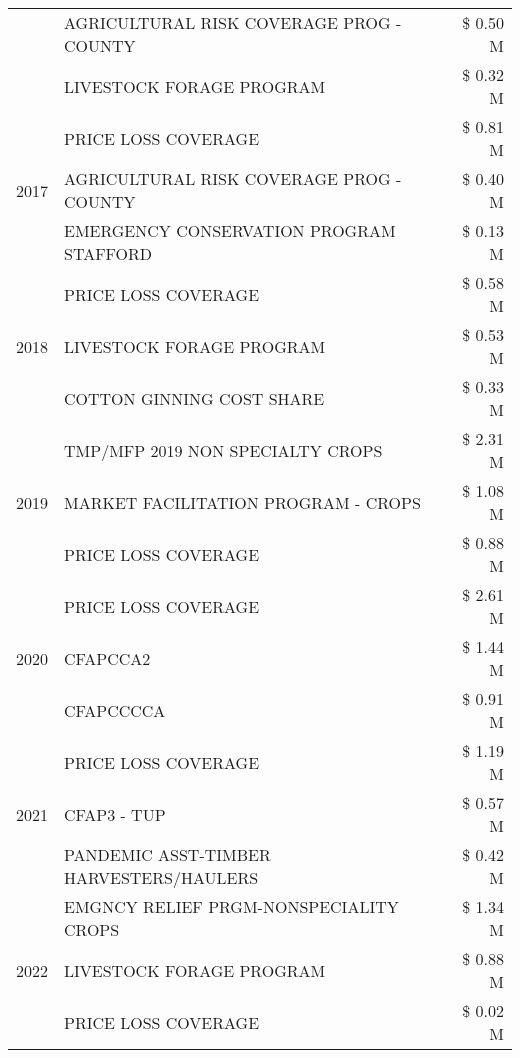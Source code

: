 \begin{tabular}{llr}
 & AGRICULTURAL RISK COVERAGE PROG - COUNTY & \$ 0.50 M \\
 & LIVESTOCK FORAGE PROGRAM & \$ 0.32 M \\
\cline{1-3}
\multirow[t]{3}{*}{2017} & PRICE LOSS COVERAGE & \$ 0.81 M \\
 & AGRICULTURAL RISK COVERAGE PROG - COUNTY & \$ 0.40 M \\
 & EMERGENCY CONSERVATION PROGRAM STAFFORD & \$ 0.13 M \\
\cline{1-3}
\multirow[t]{3}{*}{2018} & PRICE LOSS COVERAGE & \$ 0.58 M \\
 & LIVESTOCK FORAGE PROGRAM & \$ 0.53 M \\
 & COTTON GINNING COST SHARE & \$ 0.33 M \\
\cline{1-3}
\multirow[t]{3}{*}{2019} & TMP/MFP 2019 NON SPECIALTY CROPS & \$ 2.31 M \\
 & MARKET FACILITATION PROGRAM - CROPS & \$ 1.08 M \\
 & PRICE LOSS COVERAGE & \$ 0.88 M \\
\cline{1-3}
\multirow[t]{3}{*}{2020} & PRICE LOSS COVERAGE & \$ 2.61 M \\
 & CFAPCCA2 & \$ 1.44 M \\
 & CFAPCCCCA & \$ 0.91 M \\
\cline{1-3}
\multirow[t]{3}{*}{2021} & PRICE LOSS COVERAGE & \$ 1.19 M \\
 & CFAP3 - TUP & \$ 0.57 M \\
 & PANDEMIC ASST-TIMBER HARVESTERS/HAULERS & \$ 0.42 M \\
\cline{1-3}
\multirow[t]{3}{*}{2022} & EMGNCY RELIEF PRGM-NONSPECIALITY CROPS & \$ 1.34 M \\
 & LIVESTOCK FORAGE PROGRAM & \$ 0.88 M \\
 & PRICE LOSS COVERAGE & \$ 0.02 M \\
\cline{1-3}
\bottomrule
\end{tabular}
